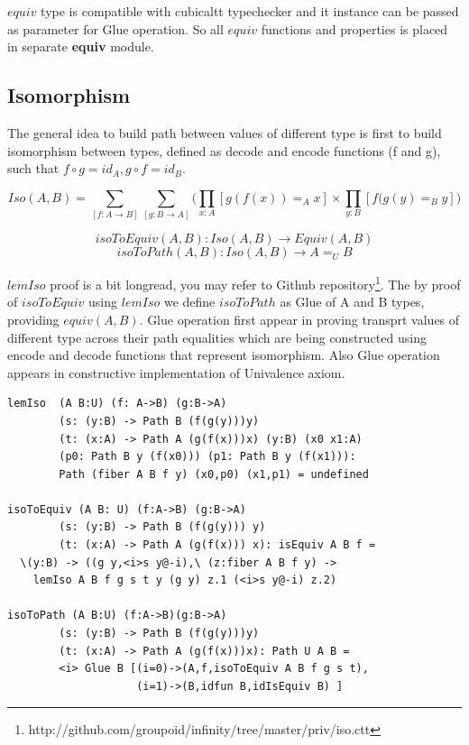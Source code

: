 \documentclass{article}
\begin{document}
$equiv$ type is compatible with cubicaltt typechecker and it instance
can be passed as parameter for Glue operation. So all $equiv$ functions and properties
is placed in separate {\bf equiv} module.

\subsection{Isomorphism}

The general idea to build path between values of different type is first
to build isomorphism between types, defined as decode and encode functions (f and g),
such that $f \circ g = id_A, g \circ f = id_B$.

$$Iso(A,B) = \sum_{[f:A\rightarrow B]}\sum_{[g:B\rightarrow A]}\Biggl( \prod_{x:A} [ g(f(x)) =_A x ] \times \prod_{y:B} [ f(g(y) =_B y ] \Biggr)$$

$$isoToEquiv(A,B) : Iso(A,B) \rightarrow Equiv(A,B)$$
$$isoToPath(A,B) : Iso(A,B) \rightarrow A =_U B$$

$lemIso$ proof is a bit longread, you may refer to Github
repository\footnote{http://github.com/groupoid/infinity/tree/master/priv/iso.ctt}.
The by proof of $isoToEquiv$ using $lemIso$ we define $isoToPath$ as
Glue of A and B types, providing $equiv(A,B)$. Glue operation first appear in
proving transprt values of different type across their path equalities which are being constructed
using encode and decode functions that represent isomorphism. Also Glue operation
appears in constructive implementation of Univalence axiom\cite{Mortberg17}.

\begin{lstlisting}[mathescape=true]
lemIso  (A B:U) (f: A->B) (g:B->A)
        (s: (y:B) -> Path B (f(g(y)))y)
        (t: (x:A) -> Path A (g(f(x)))x) (y:B) (x0 x1:A)
        (p0: Path B y (f(x0))) (p1: Path B y (f(x1))):
        Path (fiber A B f y) (x0,p0) (x1,p1) = undefined

isoToEquiv (A B: U) (f:A->B) (g:B->A)
        (s: (y:B) -> Path B (f(g(y))) y)
        (t: (x:A) -> Path A (g(f(x))) x): isEquiv A B f =
  \(y:B) -> ((g y,<i>s y@-i),\ (z:fiber A B f y) ->
    lemIso A B f g s t y (g y) z.1 (<i>s y@-i) z.2)

isoToPath (A B:U) (f:A->B)(g:B->A)
        (s: (y:B) -> Path B (f(g(y)))y)
        (t: (x:A) -> Path A (g(f(x)))x): Path U A B =
        <i> Glue B [(i=0)->(A,f,isoToEquiv A B f g s t),
                    (i=1)->(B,idfun B,idIsEquiv B) ]
\end{lstlisting}
\end{document}
